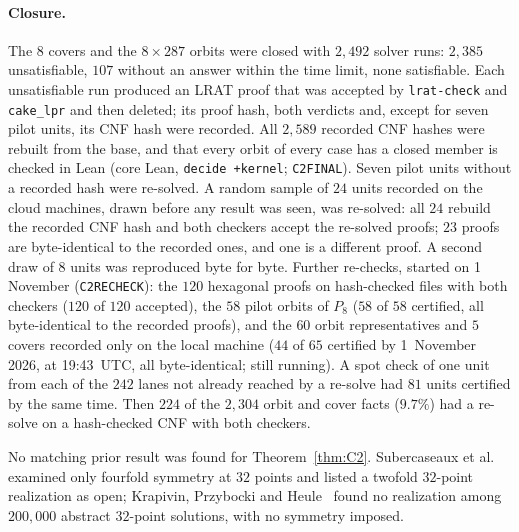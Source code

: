 \documentclass[11pt]{article}
\theoremstyle{remark}
\begin{document}
\paragraph{Closure.} The $8$ covers and the $8\times287$ orbits were closed with $2{,}492$ solver runs: $2{,}385$
unsatisfiable, $107$ without an answer within the time limit, none satisfiable. Each unsatisfiable run produced an LRAT
proof that was accepted by \texttt{lrat-check} and \texttt{cake\_lpr} and then deleted; its proof hash, both verdicts and,
except for seven pilot units, its CNF hash were recorded. All $2{,}589$ recorded CNF hashes were rebuilt from the base,
and that every orbit of every case has a closed member is checked in Lean (core Lean, \texttt{decide +kernel};
\texttt{C2FINAL}). Seven pilot units without a recorded hash were re-solved. A random sample of $24$ units recorded on the
cloud machines, drawn before any result was seen, was re-solved: all $24$ rebuild the recorded CNF hash and both checkers
accept the re-solved proofs; $23$ proofs are byte-identical to the recorded ones, and one is a different proof. A second
draw of $8$ units was reproduced byte for byte. Further re-checks, started on 1 November
(\texttt{C2RECHECK}): the $120$ hexagonal proofs on hash-checked files with both checkers ($120$ of $120$ accepted), the
$58$ pilot orbits of $P_8$ ($58$ of $58$ certified, all byte-identical to the recorded proofs), and the $60$ orbit
representatives and $5$ covers recorded only on the local machine ($44$ of $65$ certified by 1~November 2026, at
19:43~UTC, all byte-identical; still running). A spot check of one unit from each of the $242$ lanes not already reached by a re-solve had
$81$ units certified by the same time. Then $224$ of the $2{,}304$ orbit and cover facts ($9.7\%$) had a re-solve on a hash-checked CNF with
both checkers.

No matching prior result was found for Theorem~\ref{thm:C2}. Subercaseaux et al.~\cite{SMQH25} examined only fourfold
symmetry at $32$ points and listed a twofold $32$-point realization as open; Krapivin, Przybocki and Heule~\cite{KPH26}
found no realization among $200{,}000$ abstract $32$-point solutions, with no symmetry imposed.
\end{document}
